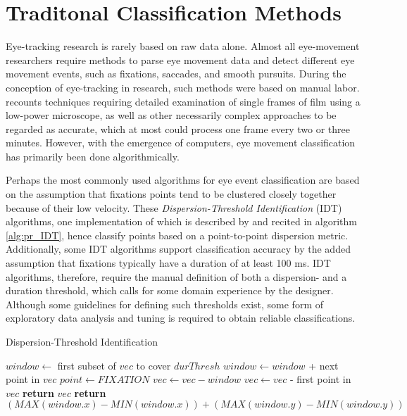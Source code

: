 \section{Traditonal Classification Methods} \label{sec:pr_TraditionalClassificationMethods}

Eye-tracking research is rarely based on raw data alone. Almost all eye-movement researchers require methods to parse eye movement data and detect different eye movement events, such as fixations, saccades, and smooth pursuits. During the conception of eye-tracking in research, such methods were based on manual labor. \cite{hartridge1948} recounts techniques requiring detailed examination of single frames of film using a low-power microscope, as well as other necessarily complex approaches to be regarded as accurate, which at most could process one frame every two or three minutes. However, with the emergence of computers, eye movement classification has primarily been done algorithmically. 

Perhaps the most commonly used algorithms for eye event classification are based on the assumption that fixations points tend to be clustered closely together because of their low velocity. These \textit{Dispersion-Threshold Identification} (IDT) algorithms, one implementation of which is described by \cite{salvucci2000} and recited in algorithm \ref{alg:pr_IDT}, hence classify points based on a point-to-point dispersion metric. Additionally, some IDT algorithms support classification accuracy by the added assumption that fixations typically have a duration of at least 100 ms. IDT algorithms, therefore, require the manual definition of both a dispersion- and a duration threshold, which calls for some domain experience by the designer. Although some guidelines for defining such thresholds exist, some form of exploratory data analysis and tuning is required to obtain reliable classifications.

\begin{algorithm}
    \caption{Dispersion-Threshold Identification}
    \label{alg:pr_IDT}
    \begin{algorithmic}[1]
                \State $window \gets$ first subset of $vec$ to cover $durThresh$
                        \State $window \gets window $ + next point in $vec$
                    \EndWhile
                        \State $point \gets FIXATION$
                    \EndFor
                    \State $vec \gets vec - window$
                \Else
                    \State $vec \gets vec $ - first point in $vec$
                \EndIf
            \EndWhile
            \State \textbf{return} $vec$
        \EndProcedure
        \State
            \State \textbf{return} $(MAX(window.x) - MIN(window.x)) + (MAX(window.y) - MIN(window.y))$
        \EndProcedure
    \end{algorithmic}
\end{algorithm}

